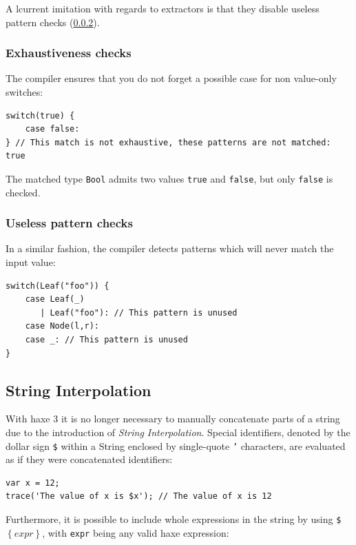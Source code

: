 \documentclass{article}
\newcommand{\type}[1]{\texttt{#1}}
\newcommand{\expr}[1]{\texttt{#1}}
\newcommand{\tref}[2]{#1 (\ref{#2})}
\begin{document}
A lcurrent imitation with regards to extractors is that they disable \tref{useless pattern checks}{Useless pattern checks}.


\subsubsection{Exhaustiveness checks}

The compiler ensures that you do not forget a possible case for non value-only switches:

\begin{lstlisting}
switch(true) {
    case false:
} // This match is not exhaustive, these patterns are not matched: true
\end{lstlisting}

The matched type \type{Bool} admits two values \expr{true} and \expr{false}, but only \expr{false} is checked. 


\subsubsection{Useless pattern checks}
\label{Useless pattern checks}

In a similar fashion, the compiler detects patterns which will never match the input value:

\begin{lstlisting}
switch(Leaf("foo")) {
    case Leaf(_)
       | Leaf("foo"): // This pattern is unused
    case Node(l,r):
    case _: // This pattern is unused
}
\end{lstlisting}



\subsection{String Interpolation}

With haxe 3 it is no longer necessary to manually concatenate parts of a string due to the introduction of \emph{String Interpolation}. Special identifiers, denoted by the dollar sign \expr{\$} within a String enclosed by single-quote \expr{'} characters, are evaluated as if they were concatenated identifiers:

\begin{lstlisting}
var x = 12;
trace('The value of x is $x'); // The value of x is 12
\end{lstlisting}
Furthermore, it is possible to include whole expressions in the string by using \expr{\$$\left\{expr\right\}$}, with \expr{expr} being any valid haxe expression:
\end{document}
